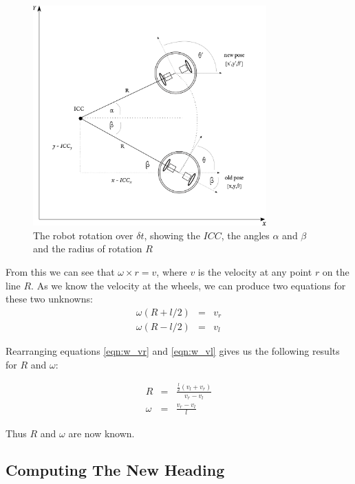 \documentclass[11pt]{article}
\begin{document}
\begin{figure}
    \centering
    \includegraphics[width=0.8\textwidth]{images/arc.png}
    \caption{The robot rotation over $\delta t$, showing the $ICC$, the angles $\alpha$ and $\beta$ and the 
             radius of rotation $R$}
    \label{fig:arc}
\end{figure}

From this we can see that $\omega\times r = v$, where $v$ is the velocity at any point $r$ on the line $R$. As we know 
the velocity at the wheels, we can produce two equations for these two unknowns:
\begin{eqnarray}
    \omega(R + l/2) &=& v_r \label{eqn:w_vr} \\
    \omega(R - l/2) &=& v_l \label{eqn:w_vl}
\end{eqnarray}

Rearranging equations \ref{eqn:w_vr} and \ref{eqn:w_vl} gives us the following results for $R$ and $\omega$:

\begin{eqnarray}
    R &=& \frac{\frac{l}{2}(v_l + v_r)}{v_r - v_l} \label{eqn:R} \\
    \omega &=& \frac{v_r - v_l}{l} \label{eqn:w}
\end{eqnarray}

Thus $R$ and $\omega$ are now known.

\subsection{Computing The New Heading}
\end{document}
